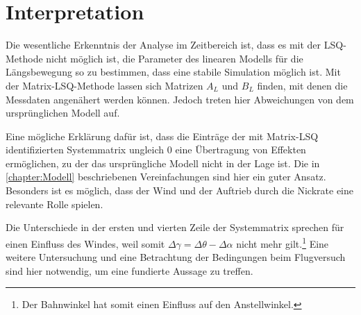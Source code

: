 \section{Interpretation}

%
%
%

Die wesentliche Erkenntnis der Analyse im Zeitbereich ist, dass es mit der LSQ-Methode nicht möglich ist, die Parameter des 
linearen Modells für die Längsbewegung so zu bestimmen, dass eine stabile Simulation möglich ist. Mit der Matrix-LSQ-Methode 
lassen sich Matrizen $ A_L $ und $ B_L $ finden, mit denen die Messdaten angenähert werden können. Jedoch treten hier 
Abweichungen von dem ursprünglichen Modell auf.\par
Eine mögliche Erklärung dafür ist, dass die Einträge der mit Matrix-LSQ identifizierten Systemmatrix ungleich $ 0 $ eine 
Übertragung von Effekten ermöglichen, zu der das ursprüngliche Modell nicht in der Lage ist. Die in \cref{chapter:Modell} 
beschriebenen Vereinfachungen sind hier ein guter Ansatz. Besonders ist es möglich, dass der Wind und der Auftrieb durch die 
Nickrate eine relevante Rolle spielen. 

Die Unterschiede in der ersten und vierten Zeile der Systemmatrix sprechen für einen Einfluss des Windes, weil somit $\Delta 
\gamma = \Delta \theta - \Delta \alpha$ nicht mehr gilt.\footnote{Der Bahnwinkel hat somit einen Einfluss auf den 
Anstellwinkel.}
Eine weitere Untersuchung und eine Betrachtung der Bedingungen beim Flugversuch sind hier notwendig, um eine fundierte 
Aussage zu treffen.
